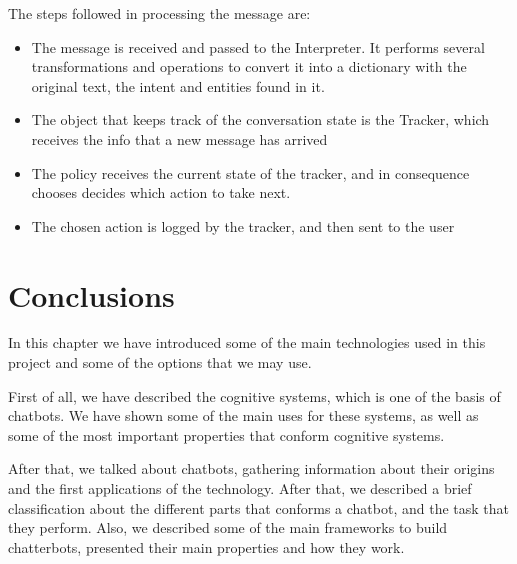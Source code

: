 The steps followed in processing the message are:
\begin{itemize}
    \item The message is received and passed to the Interpreter. It performs several transformations and operations to convert it into a dictionary with the original text, the intent and entities found in it.
    \item The object that keeps track of the conversation state is the Tracker, which receives the info that a new message has arrived
    \item The policy receives the current state of the tracker, and in consequence chooses decides which action to take next.
    \item The chosen action is logged by the tracker, and then sent to the user
\end{itemize}

\section{Conclusions}
In this chapter we have introduced some of the main technologies used in this project and some of the options that we may use.

First of all, we have described the cognitive systems, which is one of the basis of chatbots. We have shown some of the main uses for these systems, as well as some of the most important properties that conform cognitive systems.

After that, we talked about chatbots, gathering information about their origins and the first applications of the technology. After that, we described a brief classification about the different parts that conforms a chatbot, and the task that they perform. Also, we described some of the main frameworks to build chatterbots, presented their main properties and how they work.